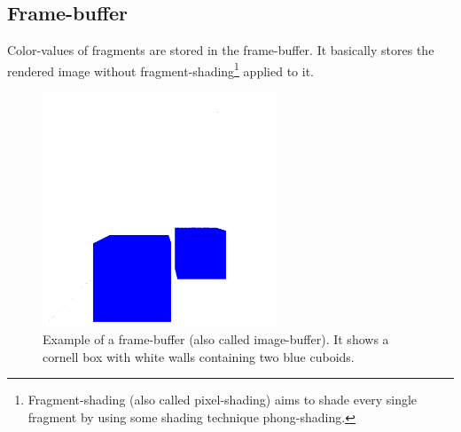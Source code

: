 \documentclass{ACGSeminar}
\begin{document}
	\subsection{Frame-buffer}%
		Color-values of fragments are stored in the frame-buffer. It basically stores the rendered image without fragment-shading\footnote{Fragment-shading (also called pixel-shading) aims to shade every single fragment by using some shading technique phong-shading.} applied to it.%
		\begin{figure}[htb!]%
			\begin{center}%
				\includegraphics[width=7cm]{img/frame_buffer.png}
			\end{center}%
			\caption{Example of a frame-buffer (also called image-buffer). It shows a cornell box with white walls containing two blue cuboids.}%
			\label{fig:frame_buffer}%
		\end{figure}%
\end{document}

